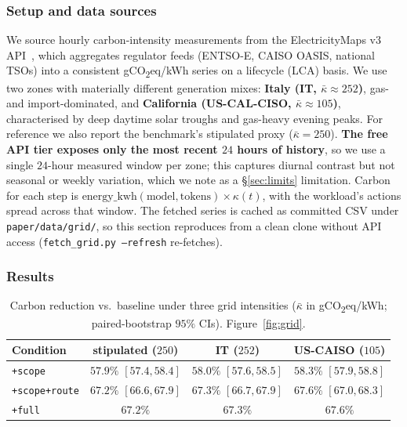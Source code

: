 \documentclass[11pt]{article}
\theoremstyle{plain}
\theoremstyle{definition}
\theoremstyle{remark}
\begin{document}
\subsubsection*{Setup and data sources}
We source hourly carbon-intensity measurements from the ElectricityMaps v3 API~\cite{electricitymaps}, which aggregates regulator feeds (ENTSO-E, CAISO OASIS, national TSOs) into a consistent gCO\textsubscript{2}eq/kWh series on a lifecycle (LCA) basis. We use two zones with materially different generation mixes: \textbf{Italy (IT, $\bar\kappa\approx252$)}, gas- and import-dominated, and \textbf{California (US-CAL-CISO, $\bar\kappa\approx105$)}, characterised by deep daytime solar troughs and gas-heavy evening peaks. For reference we also report the benchmark's stipulated proxy ($\bar\kappa=250$). \textbf{The free API tier exposes only the most recent $24$ hours of history}, so we use a single $24$-hour measured window per zone; this captures diurnal contrast but not seasonal or weekly variation, which we note as a \S\ref{sec:limits} limitation. Carbon for each step is $\text{energy\_kwh}(\text{model},\text{tokens})\times\kappa(t)$, with the workload's actions spread across that window. The fetched series is cached as committed CSV under \texttt{paper/data/grid/}, so this section reproduces from a clean clone without API access (\texttt{fetch\_grid.py --refresh} re-fetches).

\subsubsection*{Results}
\begin{table}[H]
\centering\small
\begin{tabular}{@{}lccc@{}}
\toprule
Condition & stipulated ($250$) & IT ($252$) & US-CAISO ($105$) \\
\midrule
\texttt{+scope}       & $57.9\%$ $[57.4,58.4]$ & $58.0\%$ $[57.6,58.5]$ & $58.3\%$ $[57.9,58.8]$ \\
\texttt{+scope+route} & $67.2\%$ $[66.6,67.9]$ & $67.3\%$ $[66.7,67.9]$ & $67.6\%$ $[67.0,68.3]$ \\
\texttt{+full}        & $67.2\%$ & $67.3\%$ & $67.6\%$ \\
\bottomrule
\end{tabular}
\caption{Carbon reduction vs.\ baseline under three grid intensities ($\bar\kappa$ in gCO\textsubscript{2}eq/kWh; paired-bootstrap $95\%$ CIs). Figure~\ref{fig:grid}.}
\label{tab:grid}
\end{table}
\end{document}
